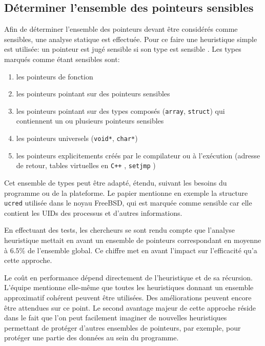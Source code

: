 \subsection{Déterminer l'ensemble des pointeurs sensibles}
\label{subsection:detEnsemblePointeursSensible}

Afin de déterminer l'ensemble des pointeurs devant être considérés comme sensibles, une analyse statique est effectuée. Pour ce faire une heuristique simple est utilisée: \og un pointeur est jugé sensible si son type est sensible \fg. Les types marqués comme étant sensibles sont:

\begin{enumerate}
	\item les pointeurs de fonction
	\item les pointeurs pointant sur des pointeurs sensibles
	\item les pointeurs pointant sur des types composés (\texttt{array}, \texttt{struct}) qui contiennent un ou plusieurs pointeurs sensibles
	\item les pointeurs universels (\texttt{void*}, \texttt{char*})
  \item les pointeurs explicitements créés par le compilateur ou à l'exécution (adresse de retour, tables virtuelles en \texttt{C++} \cite{fonctionsVirtuelles}, \texttt{setjmp} \cite{setjmp})
\end{enumerate}

Cet ensemble de types peut être adapté, étendu, suivant les besoins du programme ou de la plateforme. Le papier mentionne en exemple la structure \texttt{ucred} utilisée dans le noyau FreeBSD, qui est marquée comme sensible car elle contient les UIDs des processus et d'autres informations.

En effectuant des tests, les chercheurs se sont rendu compte que l'analyse heuristique mettait en avant un ensemble de pointeurs correspondant en moyenne à $6.5\%$ de l'ensemble global. Ce chiffre met en avant l'impact sur l'efficacité qu'a cette approche.

Le coût en performance dépend directement de l'heuristique et de sa récursion. L'équipe mentionne elle-même que toutes les heuristiques donnant un ensemble approximatif cohérent peuvent être utilisées. Des améliorations peuvent encore être attendues sur ce point. Le second avantage majeur de cette approche réside dans le fait que l'on peut facilement imaginer de nouvelles heuristiques permettant de protéger d'autres ensembles de pointeurs, par exemple, pour protéger une partie des données au sein du programme.

